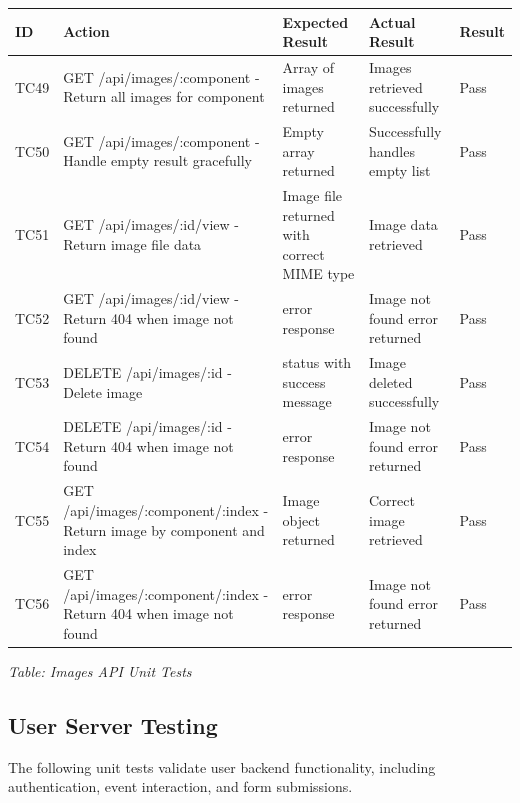 \documentclass[12pt, titlepage]{article}
\begin{document}
\noindent
\begin{longtable}{|>{\raggedright\arraybackslash}p{1cm}|>{\raggedright\arraybackslash}p{5cm}|>{\raggedright\arraybackslash}p{3.25cm}|>{\raggedright\arraybackslash}p{3.25cm}|>{\raggedright\arraybackslash}p{1.5cm}|}
\hline
\textbf{ID} & \textbf{Action} & \textbf{Expected Result} & \textbf{Actual Result} & \textbf{Result} \\\hline
\endhead
\hline
TC49 & GET /api/images/:component - Return all images for component & Array of images returned & Images retrieved successfully & \cellcolor{green!30}Pass \\
\hline
TC50 & GET /api/images/:component - Handle empty result gracefully & Empty array returned & Successfully handles empty list & \cellcolor{green!30}Pass \\
\hline
TC51 & GET /api/images/:id/view - Return image file data & Image file returned with correct MIME type & Image data retrieved & \cellcolor{green!30}Pass \\
\hline
TC52 & GET /api/images/:id/view - Return 404 when image not found & 404 error response & Image not found error returned & \cellcolor{green!30}Pass \\
\hline
TC53 & DELETE /api/images/:id - Delete image & 200 status with success message & Image deleted successfully & \cellcolor{green!30}Pass \\
\hline
TC54 & DELETE /api/images/:id - Return 404 when image not found & 404 error response & Image not found error returned & \cellcolor{green!30}Pass \\
\hline
TC55 & GET /api/images/:component/:index - Return image by component and index & Image object returned & Correct image retrieved & \cellcolor{green!30}Pass \\
\hline
TC56 & GET /api/images/:component/:index - Return 404 when image not found & 404 error response & Image not found error returned & \cellcolor{green!30}Pass \\
\hline
\end{longtable}

\vspace{0.5cm}

{\small \textit{Table: Images API Unit Tests}}

\subsection{User Server Testing}
The following unit tests validate user backend functionality, including authentication, event interaction, and form submissions.
\end{document}
